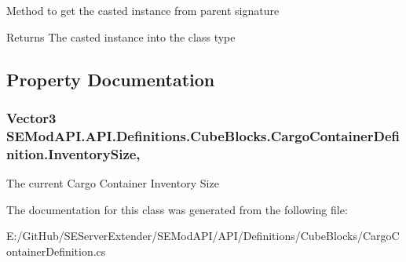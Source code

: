 Method to get the casted instance from parent signature 

\begin{DoxyReturn}{Returns}
The casted instance into the class type
\end{DoxyReturn}


\subsection{Property Documentation}
\hypertarget{class_s_e_mod_a_p_i_1_1_a_p_i_1_1_definitions_1_1_cube_blocks_1_1_cargo_container_definition_a2ef1d53a3414488606b12b3f3710a3ae}{}
\subsubsection[{Inventory\+Size}]{\setlength{\rightskip}{0pt plus 5cm}Vector3 S\+E\+Mod\+A\+P\+I.\+A\+P\+I.\+Definitions.\+Cube\+Blocks.\+Cargo\+Container\+Definition.\+Inventory\+Size\hspace{0.3cm}{\ttfamily [get]}, {\ttfamily [set]}}\label{class_s_e_mod_a_p_i_1_1_a_p_i_1_1_definitions_1_1_cube_blocks_1_1_cargo_container_definition_a2ef1d53a3414488606b12b3f3710a3ae}


The current Cargo Container Inventory Size 



The documentation for this class was generated from the following file\+:\begin{DoxyCompactItemize}
\item 
E\+:/\+Git\+Hub/\+S\+E\+Server\+Extender/\+S\+E\+Mod\+A\+P\+I/\+A\+P\+I/\+Definitions/\+Cube\+Blocks/Cargo\+Container\+Definition.\+cs\end{DoxyCompactItemize}
